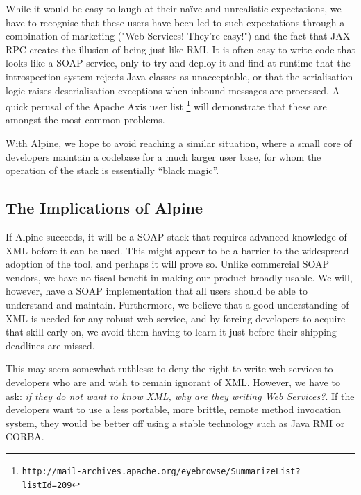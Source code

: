 While it would be easy to laugh at their na\"{i}ve and unrealistic
expectations, we have to recognise that these users have been led to
such expectations through a combination of marketing ("Web Services!
They're easy!") and the fact that JAX-RPC creates the illusion of
being just like RMI. It is often easy to write code that looks like a
SOAP service, only to try and deploy it and find at runtime that the
introspection system rejects Java classes as unacceptable, or that the
serialisation logic raises deserialisation exceptions when inbound
messages are processed. A quick perusal of the Apache Axis user list
\footnote{{\small \tt http://mail-archives.apache.org/eyebrowse/SummarizeList?listId=209}}
will demonstrate that these are amongst the most common problems.

With Alpine, we hope to avoid reaching a similar situation, where a
small core of developers maintain a codebase for a much larger user
base, for whom the operation of the stack is essentially ``black
magic''.

\subsection{The Implications of Alpine}
\label{alpine:implications}

If Alpine succeeds, it will be a SOAP stack that requires advanced
knowledge of XML before it can be used. This might appear to be a
barrier to the widespread adoption of the tool, and perhaps it will
prove so. Unlike commercial SOAP vendors, we have no fiscal benefit in
making our product broadly usable. We will, however, have a SOAP
implementation that all users should be able to understand and
maintain.  Furthermore, we believe that a good understanding of XML is
needed for any robust web service, and by forcing developers to
acquire that skill early on, we avoid them having to learn it just
before their shipping deadlines are missed.

This may seem somewhat ruthless: to deny the right to write web
services to developers who are and wish to remain ignorant of XML.
However, we have to ask: \emph{if they do not want to know XML, why are
they writing Web Services?}. If the developers want to use a less portable,
more brittle, remote method invocation system, they would be better off
using a stable technology such as Java RMI or CORBA.
